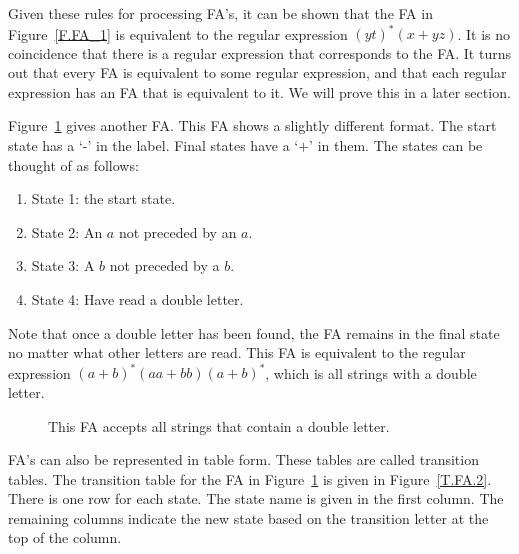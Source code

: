 \documentclass[letterpaper,12pt,openany,reqno]{book}%
\newcommand{\fanonterminalnode}[2] {\node at (#1) (#2) [circle, draw, minimum size=24pt] {#2};}
\newcommand{\fatransition}[3] {\draw [->] (#1) -- (#2) node [midway, above] {#3};}
\newcommand{\faarctransition}[5] {\draw [->] (#1) to[out=#4, in=#5] node  [midway, above] {#3} (#2) ;}
\newcommand{\faloopright}[2] {\draw (#1) edge [loop right] node {#2} ();}
\begin{document}
Given these rules for processing FA's, it can be shown that the FA in Figure~\ref{F.FA_1} is equivalent to the regular expression $(yt)^* (x + yz)$. It is no coincidence that there is a regular expression that corresponds to the FA. It turns out that every FA is equivalent to some regular expression, and that each regular expression has an FA that is equivalent to it. We will prove this in a later section.

Figure~\ref{F.FA_2} gives another FA. This FA shows a slightly different format. The start state has a `-' in the label. Final states have a `$+$' in them. The states can be thought of as follows:
\begin{enumerate}
\item State 1: the start state.
\item State 2: An $a$ not preceded by an $a$.
\item State 3: A $b$ not preceded by a $b$.
\item State 4: Have read a double letter.
\end{enumerate}
Note that once a double letter has been found, the FA remains in the final state no matter what other letters are read. This FA is equivalent to the regular expression $(a+b)^*(aa + bb)(a+b)^*$, which is all strings with a double letter.

\begin{figure}[hbt]
\centering
{}
 \caption[FA for double letters]{This FA accepts all strings that contain a double letter.}
  \label{F.FA_2}
\end{figure}

FA's can also be represented in table form. These tables are called transition tables. The transition table for the FA in Figure~\ref{F.FA_2} is given in Figure~\ref{T.FA.2}. There is one row for each state. The state name is given in the first column. The remaining columns indicate the new state based on the transition letter at the top of the column.
\end{document}
